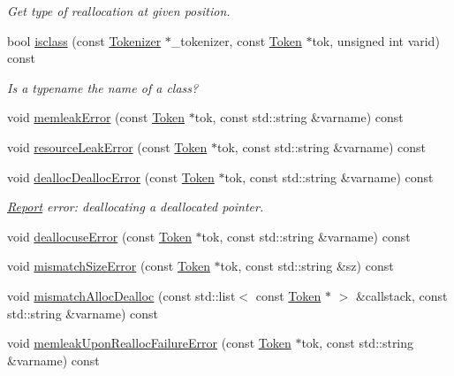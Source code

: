 \begin{DoxyCompactItemize}
\begin{DoxyCompactList}\small\item\em Get type of reallocation at given position. \end{DoxyCompactList}\item 
bool \hyperlink{class_check_memory_leak_a74c651646a8d740d6ac10a75a55de9a6}{isclass} (const \hyperlink{class_tokenizer}{Tokenizer} $\ast$\-\_\-tokenizer, const \hyperlink{class_token}{Token} $\ast$tok, unsigned int varid) const 
\begin{DoxyCompactList}\small\item\em Is a typename the name of a class? \end{DoxyCompactList}\item 
void \hyperlink{class_check_memory_leak_ab9f5beb9562d47131857c991944a720a}{memleak\-Error} (const \hyperlink{class_token}{Token} $\ast$tok, const std\-::string \&varname) const 
\item 
void \hyperlink{class_check_memory_leak_af4d07dcfedefd99351e18218bba6cced}{resource\-Leak\-Error} (const \hyperlink{class_token}{Token} $\ast$tok, const std\-::string \&varname) const 
\item 
void \hyperlink{class_check_memory_leak_a8d3693e3e6347cf64f1319d3ee5f87a4}{dealloc\-Dealloc\-Error} (const \hyperlink{class_token}{Token} $\ast$tok, const std\-::string \&varname) const 
\begin{DoxyCompactList}\small\item\em \hyperlink{class_report}{Report} error\-: deallocating a deallocated pointer. \end{DoxyCompactList}\item 
void \hyperlink{class_check_memory_leak_a28f02ba8bbf84a8f3948b3d8ef0b0932}{deallocuse\-Error} (const \hyperlink{class_token}{Token} $\ast$tok, const std\-::string \&varname) const 
\item 
void \hyperlink{class_check_memory_leak_a1e4a44523791b11ad75136637907a080}{mismatch\-Size\-Error} (const \hyperlink{class_token}{Token} $\ast$tok, const std\-::string \&sz) const 
\item 
void \hyperlink{class_check_memory_leak_a73776869e3e2109ead4e82f7c64d6fdf}{mismatch\-Alloc\-Dealloc} (const std\-::list$<$ const \hyperlink{class_token}{Token} $\ast$ $>$ \&callstack, const std\-::string \&varname) const 
\item 
void \hyperlink{class_check_memory_leak_a2a9de66deb676bc72cb6fb0a4c7b1ba1}{memleak\-Upon\-Realloc\-Failure\-Error} (const \hyperlink{class_token}{Token} $\ast$tok, const std\-::string \&varname) const 

\end{DoxyCompactItemize}
